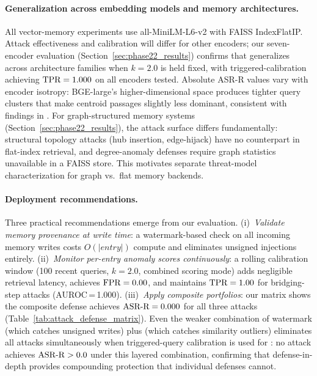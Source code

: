 \paragraph{Generalization across embedding models and memory architectures.}
All vector-memory experiments use all-MiniLM-L6-v2 with FAISS IndexFlatIP.
Attack effectiveness and \sad{} calibration will differ for other encoders;
our seven-encoder evaluation (Section~\ref{sec:phase22_results}) confirms
that \sad{} generalizes across architecture families when $k=2.0$ is
held fixed, with \agentpoison{} triggered-calibration achieving $\text{TPR}=1.000$
on all encoders tested.  Absolute ASR-R values vary with encoder isotropy:
BGE-large's higher-dimensional space produces tighter query clusters that
make centroid passages slightly less dominant, consistent with findings in
\citet{chaudhari2024phantom}.  For graph-structured memory systems
(Section~\ref{sec:phase22_results}), the attack surface differs fundamentally:
structural topology attacks (hub insertion, edge-hijack) have no counterpart
in flat-index retrieval, and degree-anomaly defenses require graph statistics
unavailable in a FAISS store.  This motivates separate threat-model
characterization for graph vs.\ flat memory backends.

\paragraph{Deployment recommendations.}
Three practical recommendations emerge from our evaluation.
(i)~\emph{Validate memory provenance at write time}: a watermark-based
check on all incoming memory writes costs $O(|entry|)$ compute and
eliminates unsigned injections entirely.
(ii)~\emph{Monitor per-entry anomaly scores continuously}: a rolling
\sad{} calibration window (100 recent queries, $k=2.0$, combined scoring
mode) adds negligible retrieval latency, achieves $\text{FPR}=0.00$, and
maintains $\text{TPR}=1.00$ for bridging-step attacks (AUROC\,=\,1.000).
(iii)~\emph{Apply composite portfolios}: our matrix shows the composite
defense achieves $\text{ASR-R} = 0.000$ for all three attacks
(Table~\ref{tab:attack_defense_matrix}).  Even the weaker combination of
watermark (which catches unsigned writes) plus \sad{} (which catches
similarity outliers) eliminates all attacks simultaneously when triggered-query
calibration is used for \sad{}: no attack achieves $\text{ASR-R} > 0.0$ under this
layered combination, confirming that defense-in-depth provides compounding
protection that individual defenses cannot.

